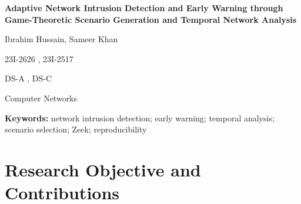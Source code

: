 \documentclass[10pt,a4paper]{article}
\begin{document}
\hypersetup{pageanchor=false}

{\centering \LARGE \bfseries Adaptive Network Intrusion Detection and Early Warning through Game-Theoretic Scenario Generation and Temporal
Network Analysis\par}
\vspace{5mm}
{\centering \large Ibrahim Hussain, Sameer Khan\par}
{\centering \large 23I-2626 , 23I-2517\par}
{\centering \large DS-A , DS-C\par}
{\centering \large Computer Networks\par}
\vspace{10mm}
\hypersetup{pageanchor=true}

\begin{abstract}
This report presents a complete implementation and experimental evaluation of an adaptive network-intrusion-detection methodology in an isolated two-segment Docker laboratory. A controller generated bounded, harmless HTTP behaviours under fixed, uniform-random, and strategic EXP3-style scenario-selection policies. Ground-truth onset, escalation, and milestone times were recorded independently of the detectors. Traffic was observed through a restricted packet-capture sidecar, validated through a seven-check fail-closed gate, and converted to Zeek connection records. Whole episodes were split before causal window construction to prevent leakage. A transparent rate rule, Isolation Forest, Random Forest, and compact GRU were compared on one frozen test set containing both seen and held-out behaviour families. The strongest balanced result in the primary seed was obtained by the random-policy GRU: episode F1 $=0.889$, PR-AUC $=0.965$, strict early-warning coverage $=0.833$, and false-positive episode rate $=0.042$. The strategic-policy GRU was consistently the most conservative across two seeds, whereas policy coverage rankings varied between seeds. The study therefore establishes a reproducible collection, validation, and pre-milestone warning pipeline, while supporting a trade-off conclusion rather than an unsupported claim of a universally superior policy.
\end{abstract}

\textbf{Keywords:} network intrusion detection; early warning; temporal analysis; scenario selection; Zeek; reproducibility

\section{Research Objective and Contributions}
\end{document}

